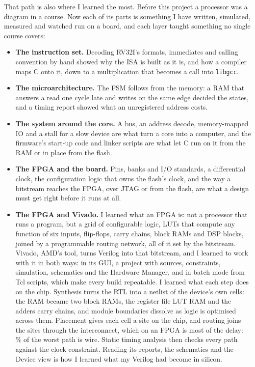 \documentclass[11pt,a4paper]{report}
\begin{document}
That path is also where I learned the most. Before this project a processor was a diagram in a
course. Now each of its parts is something I have written, simulated, measured and watched run
on a board, and each layer taught something no single course covers:

\begin{itemize}[leftmargin=*, itemsep=2pt]
  \item \textbf{The instruction set.} Decoding RV32I's formats, immediates and calling
    convention by hand showed why the ISA is built as it is, and how a compiler maps C onto it,
    down to a multiplication that becomes a call into \texttt{libgcc}.
  \item \textbf{The microarchitecture.} The FSM follows from the memory: a RAM that answers a
    read one cycle late and writes on the same edge decided the states, and a timing report
    showed what an unregistered address costs.
  \item \textbf{The system around the core.} A bus, an address decode, memory-mapped IO and a
    stall for a slow device are what turn a core into a computer, and the firmware's start-up
    code and linker scripts are what let C run on it from the RAM or in place from the flash.
  \item \textbf{The FPGA and the board.} Pins, banks and I/O standards, a differential clock,
    the configuration logic that owns the flash's clock, and the way a bitstream reaches the
    FPGA, over JTAG or from the flash, are what a design must get right before it runs at all.
  \item \textbf{The FPGA and Vivado.} I learned what an FPGA is: not a processor that runs a
    program, but a grid of configurable logic, LUTs that compute any function of six inputs,
    flip-flops, carry chains, block RAMs and DSP blocks, joined by a programmable routing
    network, all of it set by the bitstream. Vivado, AMD's tool, turns Verilog into that
    bitstream, and I learned to work with it in both ways: in its GUI, a project with sources,
    constraints, simulation, schematics and the Hardware Manager, and in batch mode from Tcl
    scripts, which make every build repeatable. I learned what each step does on the chip.
    Synthesis turns the RTL into a netlist of the device's own cells: the RAM became two block
    RAMs, the register file LUT RAM and the adders carry chains, and module boundaries dissolve
    as logic is optimised across them. Placement gives each cell a site on the chip, and routing
    joins the sites through the interconnect, which on an FPGA is most of the delay: \implPathNetPct\,\% of
    the worst path is wire. Static timing analysis then checks every path against the clock
    constraint. Reading its reports, the schematics and the Device view is how I learned what my
    Verilog had become in silicon.
\end{itemize}
\end{document}
